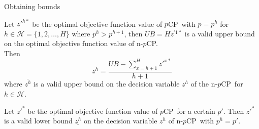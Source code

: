 \documentclass[utf8,aspectratio=169,ngerman,english]{beamer}
\newcommand{\nPCE}{\hyperref[eq:nPCE]{\texttt{(nPC3)}}}
\newcommand{\nPCY}{\hyperref[eq:nPCY]{\texttt{(nPC2)}}}
\newcommand{\pCP}{$p$CP}
\newcommand{\npCP}{n-$p$CP}
\begin{document}
\begin{frame}[allowframebreaks]{Obtaining bounds}
    \begin{lemma}\label{lemma:upperbounds}
        Let $z'^{h*}$ be the optimal objective function value of \pCP\ with $p = p^h$ for $h \in \mathcal H = \{1, 2, \dots, H\}$ where $p^h > p^{h+1}$, then 
        $UB = H z^{'1*}$ is a valid upper bound on the optimal objective function value of \npCP. \\
        Then
        \begin{equation*}
            \overline{z^h} = \frac{UB - \sum_{x = h+1}^{H}z'^{x*}}{h+1}
        \end{equation*}
        where $\overline{z^h}$ is a valid upper bound on the decision variable $z^h$ of the \npCP\ for $h \in \mathcal H$.
    \end{lemma}
    \begin{lemma}\label{lemma:lowerbounds}
        Let $z'^{*}$ be the optimal objective function value of \pCP\ for a certain $p'$. Then $z'^{*}$ is a valid lower bound $\underline{z^h}$ on the decision variable $z^h$ of \npCP\ with $p^h = p'$. 
    \end{lemma}
\end{frame}
\end{document}
